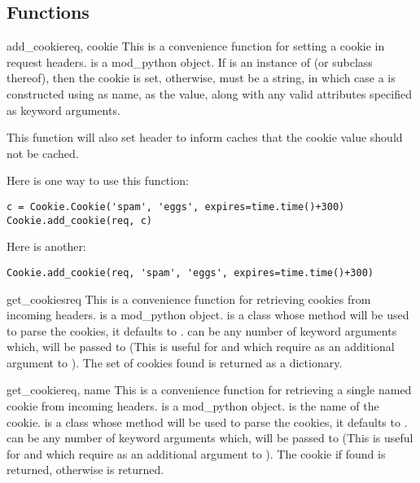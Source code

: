 \subsection{Functions\label{pyapi-cookie-func}}

\begin{funcdesc}{add_cookie}{req, cookie}
  This is a convenience function for setting a cookie in request
  headers.  is a mod_python  object.  If
   is an instance of  (or subclass thereof),
  then the cookie is set, otherwise,  must be a string, in
  which case a  is constructed using  as
  name,  as the value, along with any valid 
  attributes specified as keyword arguments.

  This function will also set  header to inform caches that the cookie value
  should not be cached.

  Here is one way to use this function:
  \begin{verbatim}
c = Cookie.Cookie('spam', 'eggs', expires=time.time()+300)
Cookie.add_cookie(req, c)
  \end{verbatim}
  Here is another:
  \begin{verbatim}
Cookie.add_cookie(req, 'spam', 'eggs', expires=time.time()+300)
  \end{verbatim}
\end{funcdesc}

\begin{funcdesc}{get_cookies}{req }
  This is a convenience function for retrieving cookies from incoming
  headers.  is a mod_python 
  object.  is a class whose  method will be
  used to parse the cookies, it defaults to . 
  can be any number of keyword arguments which, will be passed to
   (This is useful for  and
   which require  as an additional
  argument to ). The set of cookies found is returned as
  a dictionary.
\end{funcdesc}

\begin{funcdesc}{get_cookie}{req, name }
  This is a convenience function for retrieving a single named cookie
  from incoming headers.  is a mod_python 
  object.  is the name of the cookie.  is a class
  whose  method will be used to parse the cookies, it
  defaults to .  can be any number of keyword
  arguments which, will be passed to  (This is useful for
   and  which require
   as an additional argument to ). The cookie
  if found is returned, otherwise  is returned.
\end{funcdesc}

